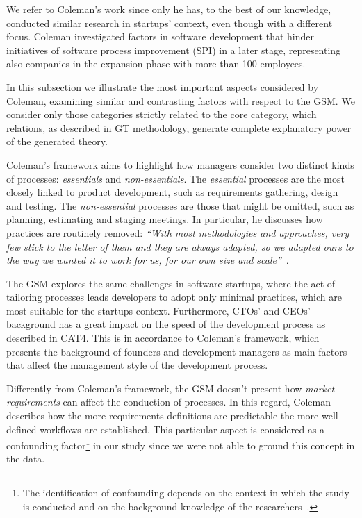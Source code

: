 \documentclass[10pt,journal,letterpaper,compsoc]{IEEEtran}
\begin{document}
We refer to Coleman's work since only he has, to the best of our knowledge, 
conducted similar research in startups' context, even though with a different 
focus. Coleman investigated factors in software development that hinder 
initiatives of software process improvement (SPI) in a later stage, 
representing also companies in the expansion phase with more than 100
employees. %

In this subsection we illustrate the most important aspects considered by
Coleman, examining similar and contrasting factors with respect to the GSM. We
consider only those categories strictly related to the core category, which
relations, as described in GT methodology, generate complete explanatory power
of the generated theory.

Coleman's framework aims to highlight how managers consider two distinct kinds
of processes: \textit{essentials} and \textit{non-essentials}. The
\textit{essential} processes are the most closely linked to product development,
such as requirements gathering, design and testing. The \textit{non-essential}
processes are those that might be omitted, such as planning, estimating and
staging meetings. In particular, he discusses how practices are routinely
removed: \textit{``With most methodologies and approaches, very few stick to the
letter of them and they are always adapted, so we adapted ours to the way we
wanted it to work for us, for our own size and scale''}~\cite{Coleman2008}.

The GSM explores the same challenges in software startups, where the act of
tailoring processes leads developers to adopt only minimal practices, which are
most suitable for the startups context. Furthermore, CTOs' and CEOs' background
has a great impact on the speed of the development process as described in CAT4.
This is in accordance to Coleman's framework, which presents the background of
founders and development managers as main factors that affect the management
style of the development process.

Differently from Coleman's framework, the GSM doesn't present how
\textit{market requirements} can affect the conduction of processes. In this
regard, Coleman describes how the more requirements definitions are predictable
the more well-defined workflows are established. This particular aspect is
considered as a confounding factor\footnote{The identification of confounding
depends on the context in which the study is conducted and on the background
knowledge of the researchers~\cite{Pearl2011}.} in our study since we were not
able to ground this concept in the data.
\end{document}
